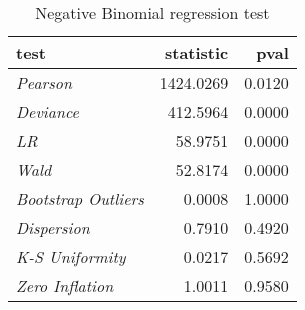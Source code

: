 \begin{table}[H]

\caption{\label{tab:negbin_reg_tests}Negative Binomial regression test}
\centering
\begin{tabular}[t]{>{}l|r|r}
\hline
test & statistic & pval\\
\hline
\em{Pearson} & 1424.0269 & 0.0120\\
\hline
\em{Deviance} & 412.5964 & 0.0000\\
\hline
\em{LR} & 58.9751 & 0.0000\\
\hline
\em{Wald} & 52.8174 & 0.0000\\
\hline
\em{Bootstrap Outliers} & 0.0008 & 1.0000\\
\hline
\em{Dispersion} & 0.7910 & 0.4920\\
\hline
\em{K-S Uniformity} & 0.0217 & 0.5692\\
\hline
\em{Zero Inflation} & 1.0011 & 0.9580\\
\hline
\end{tabular}
\end{table}
